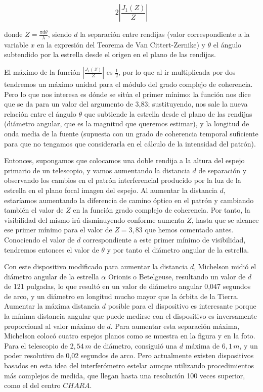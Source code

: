 \documentclass[12pt,a4paper]{report}
\newcommand{\esp}{\vspace{0.5cm}}
\begin{document}
	\begin{equation}
		2 \left| \frac{J_1(Z)}{Z} \right|
	\end{equation}
	
	\esp
	
	donde $Z = \frac{\pi d \theta}{\lambda}$, siendo $d$ la separación entre rendijas (valor correspondiente a la variable $x$ en la expresión del Teorema de Van Cittert-Zernike) y $\theta$ el ángulo subtendido por la estrella desde el origen en el plano de las rendijas.
	
	\esp
	
	El máximo de la función $\left| \frac{J_1(Z)}{Z} \right|$ es $\frac{1}{2}$, por lo que al ir multiplicada por dos tendremos un máximo unidad para el módulo del grado complejo de coherencia. Pero lo que nos interesa es dónde se sitúa el primer mínimo: la función nos dice que se da para un valor del argumento de 3,83; sustituyendo, nos sale la nueva relación entre el ángulo $\theta$ que subtiende la estrella desde el plano de las rendijas (diámetro angular, que es la magnitud que queremos estimar), y la longitud de onda media de la fuente (supuesta con un grado de coherencia temporal suficiente para que no tengamos que considerarla en el cálculo de la intensidad del patrón).
	
	\esp
	
	Entonces, supongamos que colocamos una doble rendija a la altura del espejo primario de un telescopio, y vamos aumentando la distancia $d$ de separación y observando los cambios en el patrón interferencial producido por la luz de la estrella en el plano focal imagen del espejo. Al aumentar la distancia $d$, estaríamos aumentando la diferencia de camino óptico en el patrón y cambiando también el valor de $Z$ en la función grado complejo de coherencia. Por tanto, la visibilidad del mismo irá disminuyendo conforme aumenta $Z$, hasta que se alcance ese primer mínimo para el valor de $Z = 3,83$ que hemos comentado antes. Conociendo el valor de $d$ correspondiente a este primer mínimo de visibilidad, tendremos entonces el valor de $\theta$ y por tanto el diámetro angular de la estrella.
	
	\esp
	
	Con este dispositivo modificado para aumentar la distancia $d$, Michelson midió el diámetro angular de la estrella $\alpha$ Orionis o Betelgeuse, resultando un valor de $d$ de 121 pulgadas, lo que resultó en un valor de diámetro angular 0,047 segundos de arco, y un diámetro en longitud mucho mayor que la órbita de la Tierra. Aumentar la máxima distancia $d$ posible para el dispositivo es interesante porque la mínima distancia angular que puede medirse con el dispositivo es inversamente proporcional al valor máximo de $d$. Para aumentar esta separación máxima, Michelson colocó cuatro espejos planos como se muestra en la figura y en la foto. Para el telescopio de $2,54 \, m$ de diámetro, consiguió una $d$ máxima de $6,1 \, m$, y un poder resolutivo de 0,02 segundos de arco. Pero actualmente existen dispositivos basados en esta idea del interferómetro estelar aunque utilizando procedimientos más complejos de medida, que llegan hasta una resolución 100 veces superior, como el del centro $CHARA$.
	
\end{document}
